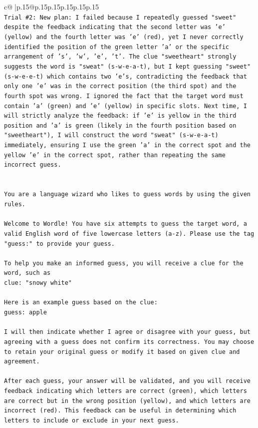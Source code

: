 \documentclass{article}
\begin{document}
{\begin{supertabular}{c@{$\;$}|p{.15\linewidth}@{}p{.15\linewidth}p{.15\linewidth}p{.15\linewidth}p{.15\linewidth}p{.15\linewidth}}
{{{\\ 
\texttt{Trial \#2: New plan: I failed because I repeatedly guessed "sweet" despite the feedback indicating that the second letter was 'e' (yellow) and the fourth letter was 'e' (red), yet I never correctly identified the position of the green letter 'a' or the specific arrangement of 's', 'w', 'e', 't'. The clue "sweetheart" strongly suggests the word is "sweat" (s{-}w{-}e{-}a{-}t), but I kept guessing "sweet" (s{-}w{-}e{-}e{-}t) which contains two 'e's, contradicting the feedback that only one 'e' was in the correct position (the third spot) and the fourth spot was wrong. I ignored the fact that the target word must contain 'a' (green) and 'e' (yellow) in specific slots. Next time, I will strictly analyze the feedback: if 'e' is yellow in the third position and 'a' is green (likely in the fourth position based on "sweetheart"), I will construct the word "sweat" (s{-}w{-}e{-}a{-}t) immediately, ensuring I use the green 'a' in the correct spot and the yellow 'e' in the correct spot, rather than repeating the same incorrect guess.} \\
\\ 
\\ 
\texttt{You are a language wizard who likes to guess words by using the given rules.} \\
\\ 
\texttt{Welcome to Wordle! You have six attempts to guess the target word, a valid English word of five lowercase letters (a{-}z). Please use the tag "guess:" to provide your guess.} \\
\\ 
\texttt{To help you make an informed guess, you will receive a clue for the word, such as} \\
\texttt{clue: "snowy white"} \\
\\ 
\texttt{Here is an example guess based on the clue: } \\
\texttt{guess: apple} \\
\\ 
\texttt{I will then indicate whether I agree or disagree with your guess, but agreeing with a guess does not confirm its correctness. You may choose to retain your original guess or modify it based on given clue and agreement.} \\
\\ 
\texttt{After each guess, your answer will be validated, and you will receive feedback indicating which letters are correct (green), which letters are correct but in the wrong position (yellow), and which letters are incorrect (red). This feedback can be useful in determining which letters to include or exclude in your next guess.} \\
}}}
\end{supertabular}}
\end{document}
